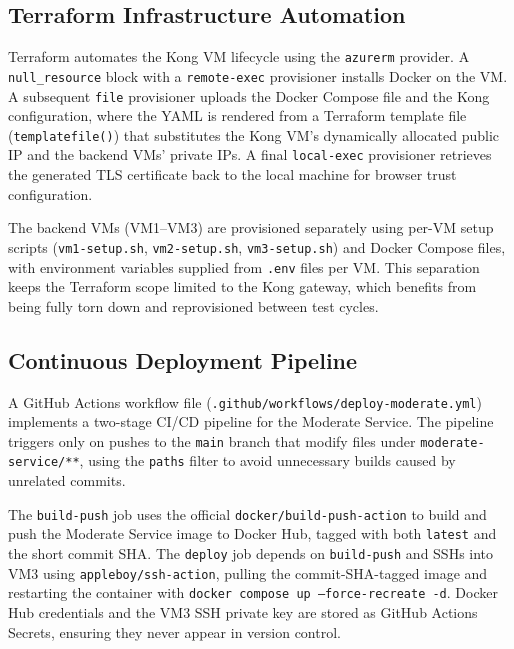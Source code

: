 \documentclass[12pt,a4paper]{article}
\begin{document}
\subsection{Terraform Infrastructure Automation}

Terraform automates the Kong VM lifecycle using the \texttt{azurerm} provider. A \texttt{null\_resource} block with a \texttt{remote-exec} provisioner installs Docker on the VM. A subsequent \texttt{file} provisioner uploads the Docker Compose file and the Kong configuration, where the YAML is rendered from a Terraform template file (\texttt{templatefile()}) that substitutes the Kong VM's dynamically allocated public IP and the backend VMs' private IPs. A final \texttt{local-exec} provisioner retrieves the generated TLS certificate back to the local machine for browser trust configuration.

The backend VMs (VM1--VM3) are provisioned separately using per-VM setup scripts (\texttt{vm1-setup.sh}, \texttt{vm2-setup.sh}, \texttt{vm3-setup.sh}) and Docker Compose files, with environment variables supplied from \texttt{.env} files per VM. This separation keeps the Terraform scope limited to the Kong gateway, which benefits from being fully torn down and reprovisioned between test cycles.

\subsection{Continuous Deployment Pipeline}

A GitHub Actions workflow file (\texttt{.github/workflows/deploy-moderate.yml}) implements a two-stage CI/CD pipeline for the Moderate Service. The pipeline triggers only on pushes to the \texttt{main} branch that modify files under \texttt{moderate-service/**}, using the \texttt{paths} filter to avoid unnecessary builds caused by unrelated commits.

The \texttt{build-push} job uses the official \texttt{docker/build-push-action} to build and push the Moderate Service image to Docker Hub, tagged with both \texttt{latest} and the short commit SHA. The \texttt{deploy} job depends on \texttt{build-push} and SSHs into VM3 using \texttt{appleboy/ssh-action}, pulling the commit-SHA-tagged image and restarting the container with \texttt{docker compose up --force-recreate -d}. Docker Hub credentials and the VM3 SSH private key are stored as GitHub Actions Secrets, ensuring they never appear in version control.

\end{document}
